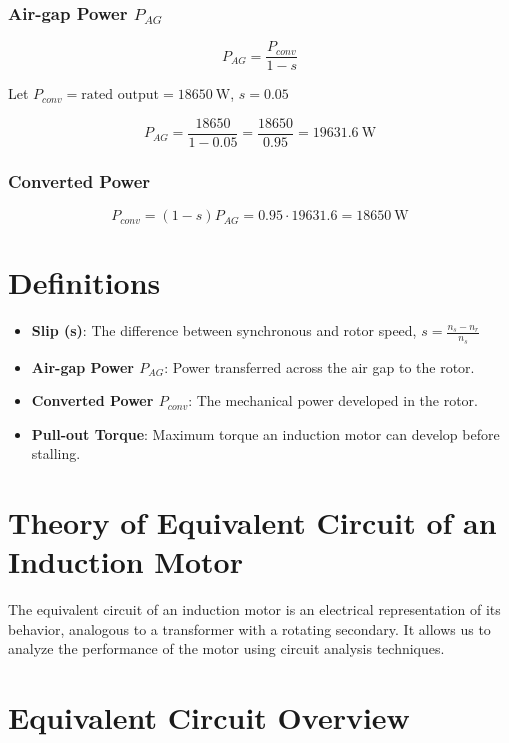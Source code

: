 \documentclass[a4paper,12pt]{article}
\begin{document}
	\subsubsection*{Air-gap Power \( P_{AG} \)}
	\[
	P_{AG} = \frac{P_{conv}}{1 - s}
	\]
	
	Let $P_{conv} = \text{rated output} = 18650\ \text{W}$, $s = 0.05$
	
	\[
	P_{AG} = \frac{18650}{1 - 0.05} = \frac{18650}{0.95} = 19631.6\ \text{W}
	\]
	
	\subsubsection*{Converted Power}
	
	\[
	P_{conv} = (1 - s)P_{AG} = 0.95 \cdot 19631.6 = 18650\ \text{W}
	\]
	
	\section*{Definitions}
	
	\begin{itemize}
		\item \textbf{Slip (s)}: The difference between synchronous and rotor speed, $s = \frac{n_s - n_r}{n_s}$
		\item \textbf{Air-gap Power \( P_{AG} \)}: Power transferred across the air gap to the rotor.
		\item \textbf{Converted Power \( P_{conv} \)}: The mechanical power developed in the rotor.
		\item \textbf{Pull-out Torque}: Maximum torque an induction motor can develop before stalling.
	\end{itemize}
	
	\newpage
	\section*{Theory of Equivalent Circuit of an Induction Motor}
	
	The equivalent circuit of an induction motor is an electrical representation of its behavior, analogous to a transformer with a rotating secondary. It allows us to analyze the performance of the motor using circuit analysis techniques.
	
	\section{Equivalent Circuit Overview}
	
\end{document}
